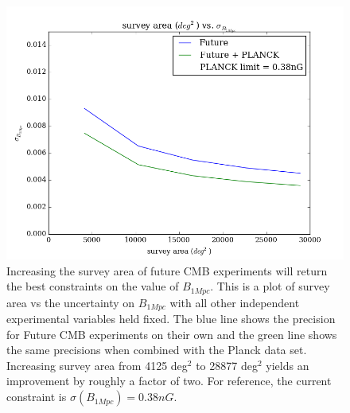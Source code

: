 \begin{figure}[h]
\centering
\includegraphics[scale=0.7]{images/area.png}
\caption{Increasing the survey area of future CMB experiments will return the best constraints on the value of $B_{1Mpc}$. This is a plot of survey area vs the uncertainty on $B_{1Mpc}$ with all other independent experimental variables held fixed. The blue line shows the precision for Future CMB experiments on their own and the green line shows the same precisions when combined with the Planck data set. Increasing survey area from 4125 deg$^2$ to 28877 deg$^2$ yields an improvement by roughly a factor of two. For reference, the current constraint is $\sigma(B_{1Mpc}) = 0.38nG$.}
\label{fig:area}
\end{figure}

